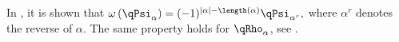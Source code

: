 In \cite{BallantineDaughertyHicksMason2020}, it is shown that
$
\omega\left( \qPsi_\alpha \right) = (-1)^{|\alpha|-\length(\alpha)}\qPsi_{\alpha^r},
$
where $\alpha^r$ denotes the reverse of $\alpha$.
The same property holds for $\qRho_\alpha$, see
\cite[Thm.~5.7]{AliniaeifardWangWilligenburg2021x}.

